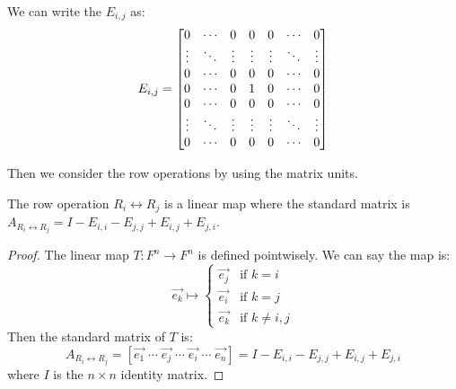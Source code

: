 \documentclass[
	11pt, %
	fleqn, %
	a4paper, %
]{LegrandOrangeBook}
\newcommand{\mypoint}[2]{\tikz[remember picture]{\node[inner sep=0, anchor=base](#1){$#2$};}}
\begin{document}
We can write the $E_{i,j}$ as:
\vspace{7ex}
\[
    E_{i,j} = \begin{bmatrix}
        0 & \cdots & 0 & \mypoint{herei}{0} & 0 & \cdots & 0 \\
        \vdots & \ddots & \vdots & \vdots & \vdots & \ddots & \vdots \\
        0 & \cdots & 0 & 0 & 0 & \cdots & 0 \\
        0 & \cdots & 0 & 1 & 0 & \cdots & \mypoint{herej}{0} \\
        0 & \cdots & 0 & 0 & 0 & \cdots & 0 \\
        \vdots & \ddots & \vdots & \vdots & \vdots & \ddots & \vdots \\
        0 & \cdots & 0 & 0 & 0 & \cdots & 0 \\
    \end{bmatrix}
\]

Then we consider the row operations by using the matrix units.

\begin{proposition}
    The row operation $R_i \leftrightarrow R_j$ is a linear map where the standard matrix is $A_{R_i \leftrightarrow R_j} = I - E_{i,i} - E_{j,j} + E_{i,j} + E_{j,i}$.
\end{proposition}

\begin{proof}
    The linear map $T: F^n \to F^n$ is defined pointwisely. We can say the map is:
    \[
        \vec{e_k} \mapsto \begin{cases}
            \vec{e_j} & \text{if } k = i \\
            \vec{e_i} & \text{if } k = j \\
            \vec{e_k} & \text{if } k \neq i, j
        \end{cases}
    \]
    Then the standard matrix of $T$ is:
    \[
        A_{R_i \leftrightarrow R_j} = [\vec{e_1} \; \cdots \; \vec{e_j} \; \cdots \; \vec{e_i} \; \cdots \; \vec{e_n}] = I - E_{i,i} - E_{j,j} + E_{i,j} + E_{j,i}
    \]
    where $I$ is the $n \times n$ identity matrix.
\end{proof}
\end{document}
